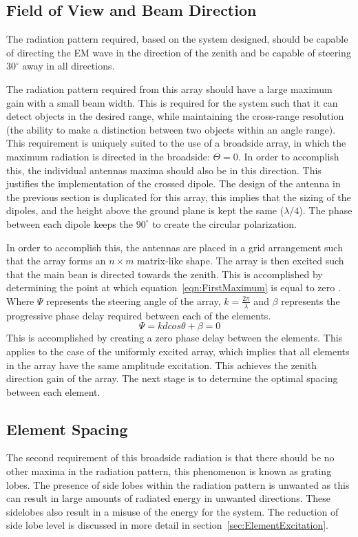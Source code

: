 \documentclass[11pt]{witseiepaper}
\begin{document}
\begin{bibunit}[witseie]
\subsection{Field of View and Beam Direction} \label{sec:FieldofViewandBeamDirection}
The radiation pattern required, based on the system designed, should be capable of directing the EM wave in the direction of the zenith and be capable of steering $30^{\circ}$ away in all directions.

The radiation pattern required from this array should have a large maximum gain with a small beam width. This is required for the system such that it can detect objects in the desired range, while maintaining the cross-range resolution (the ability to make a distinction between two objects within an angle range).
This requirement is uniquely suited to the use of a broadside array, in which the maximum radiation is directed in the broadside: $\Theta = 0$. In order to accomplish this, the individual antennas maxima should also be in this direction. This justifies the implementation of the crossed dipole. The design of the antenna in the previous section is duplicated for this array, this implies that the sizing of the dipoles, and the height above the ground plane is kept the same ($\lambda /4$). The phase between each dipole keeps the $90^{\circ}$ to create the circular polarization.

In order to accomplish this, the antennas are placed in a grid arrangement such that the array forms an $n \times m$ matrix-like shape.
The array is then excited such that the main bean is directed towards the zenith. This is accomplished by determining the point at which equation~\ref{eqn:FirstMaximum} is equal to zero \cite[p.~296]{Balanis}. Where $\Psi$ represents the steering angle of the array, $k = \frac{2 \pi}{\lambda}$ and $\beta$ represents the progressive phase delay required between each of the elements.
\begin{equation} \label{eqn:FirstMaximum}
\Psi = k d cos \theta + \beta = 0
\end{equation}
This is accomplished by creating a zero phase delay between the elements. This applies to the case of the uniformly excited array, which implies that all elements in the array have the same amplitude excitation.
This achieves the zenith direction gain of the array. The next stage is to determine the optimal spacing between each element.

\subsection{Element Spacing} \label{sec:ElementSpacing}
The second requirement of this broadside radiation is that there should be no other maxima in the radiation pattern, this phenomenon is known as grating lobes. The presence of side lobes within the radiation pattern is unwanted as this can result in large amounts of radiated energy in unwanted directions. These sidelobes also result in a misuse of the energy for the system. The reduction of side lobe level is discussed in more detail in section~\ref{sec:ElementExcitation}.


\end{bibunit}
\end{document}
